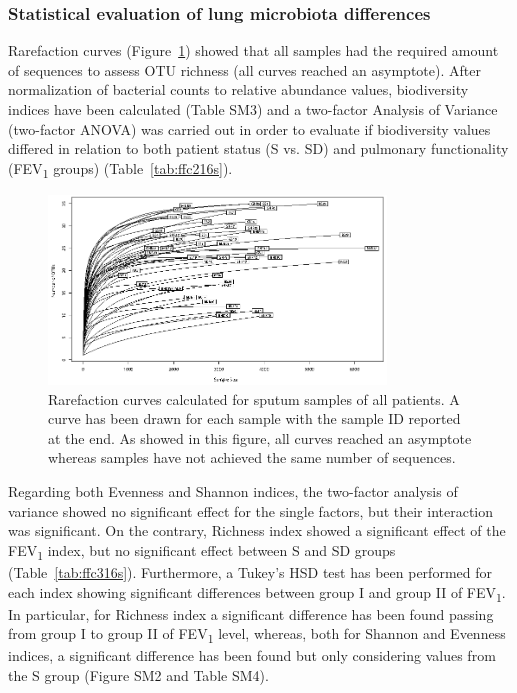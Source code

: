 \subsubsection{Statistical evaluation of lung microbiota differences}
Rarefaction curves (Figure~\ref{fig:fig316s}) showed that all samples had the required amount of sequences to assess OTU richness (all curves reached an asymptote). After normalization of bacterial counts to relative abundance values, biodiversity indices have been calculated (Table SM3) and a two-factor Analysis of Variance (two-factor ANOVA) was carried out in order to evaluate if biodiversity values differed in relation to both patient status (S vs. SD) and pulmonary functionality (FEV\textsubscript{1} groups) (Table~\ref{tab:ffc216s}). %
\begin{figure}[!tb]
	\centering
	\includegraphics[width=0.8\textwidth]{./figures/Chapter_7/Figure_3_16s}
  	\caption{\label{fig:fig316s} Rarefaction curves calculated for sputum samples of all patients. A curve has been drawn for each sample with the sample ID reported at the end. As showed in this figure, all curves reached an asymptote whereas samples have not achieved the same number of sequences.}
\end{figure}%
Regarding both Evenness and Shannon indices, the two-factor analysis of variance showed no significant effect for the single factors, but their interaction was significant. On the contrary, Richness index showed a significant effect of the FEV\textsubscript{1} index, but no significant effect between S and SD groups (Table~\ref{tab:ffc316s}). Furthermore, a Tukey's HSD test has been performed for each index showing significant differences between group I and group II of FEV\textsubscript{1}. In particular, for Richness index a significant difference has been found passing from group I to group II of FEV\textsubscript{1} level, whereas, both for Shannon and Evenness indices, a significant difference has been found but only considering values from the S group (Figure SM2 and Table SM4).\\
